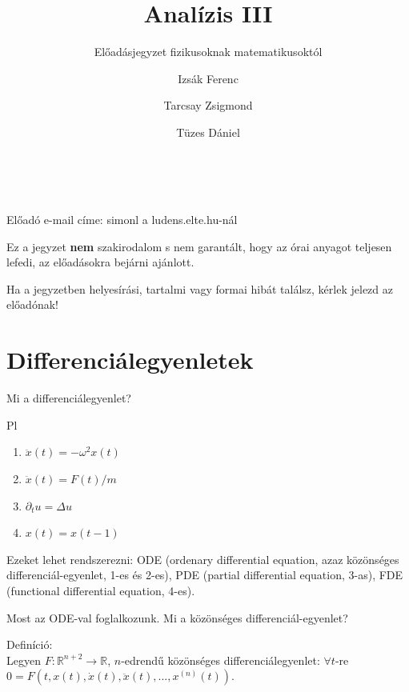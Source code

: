 \documentclass[12pt,a4paper]{scrartcl}
\title{Analízis III}
\subtitle{Előadásjegyzet fizikusoknak matematikusoktól}
\author{Izsák Ferenc \and Tarcsay Zsigmond \and Tüzes Dániel}
\institute{ELTE}
\date{}
\providecommand{\tightlist}{%
  \setlength{\itemsep}{0pt}\setlength{\parskip}{0pt}}
\newenvironment{definicio}{}{}
\begin{document}
\maketitle


\setcounter{tocdepth}{6}
\tableofcontents

~

Előadó e-mail címe: simonl a ludens.elte.hu-nál

Ez a jegyzet \textbf{nem} szakirodalom s nem garantált, hogy az órai
anyagot teljesen lefedi, az előadásokra bejárni ajánlott.

Ha a jegyzetben helyesírási, tartalmi vagy formai hibát találsz, kérlek
jelezd az előadónak!

\hypertarget{differencialegyenletek}{%
\section{Differenciálegyenletek}\label{differencialegyenletek}}

Mi a differenciálegyenlet?

Pl

\begin{enumerate}
\def\labelenumi{\arabic{enumi}.}
\tightlist
\item
  \(\ddot x\left( t \right) = - {\omega ^2}x\left( t \right)\)
\item
  \(\ddot x\left( t \right) = F\left( t \right)/m\)
\item
  \(\partial_{t}u = \Delta u\)
\item
  \(\overset{}{x}\left( t \right) = x\left( {t - 1} \right)\)
\end{enumerate}

Ezeket lehet rendszerezni: ODE (ordenary differential equation, azaz
közönséges differenciál-egyenlet, 1-es és 2-es), PDE (partial
differential equation, 3-as), FDE (functional differential equation,
4-es).

Most az ODE-val foglalkozunk. Mi a közönséges differenciál-egyenlet?

\begin{definicio}

Definíció:\\
Legyen \(\left. F:{\mathbb{R}}^{n + 2}\rightarrow{\mathbb{R}} \right.\),
\(n\)-edrendű közönséges differenciálegyenlet: \(\forall t\)-re
\(0 = F\left( {t,x\left( t \right),\dot x\left( t \right),\ddot x\left( t \right),...,{x^{\left( n \right)}}\left( t \right)} \right)\).

\end{definicio}
\end{document}
